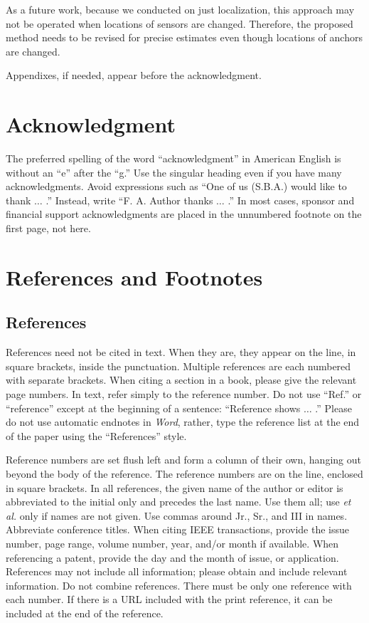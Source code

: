 \documentclass{ieeeaccess}
\begin{document}
As a future work, because we conducted on just localization, this approach may not be operated when locations of sensors are changed. Therefore, the proposed method needs to be revised for precise estimates even though locations of anchors are changed. 

\appendices

Appendixes, if needed, appear before the acknowledgment.

\section*{Acknowledgment}

The preferred spelling of the word ``acknowledgment'' in American English is 
without an ``e'' after the ``g.'' Use the singular heading even if you have 
many acknowledgments. Avoid expressions such as ``One of us (S.B.A.) would 
like to thank $\ldots$ .'' Instead, write ``F. A. Author thanks $\ldots$ .'' In most 
cases, sponsor and financial support acknowledgments are placed in the 
unnumbered footnote on the first page, not here.

\section*{References and Footnotes}

\subsection{References}
References need not be cited in text. When they are, they appear on the 
line, in square brackets, inside the punctuation. Multiple references are 
each numbered with separate brackets. When citing a section in a book, 
please give the relevant page numbers. In text, refer simply to the 
reference number. Do not use ``Ref.'' or ``reference'' except at the 
beginning of a sentence: ``Reference \cite{b3} shows $\ldots$ .'' Please do not use 
automatic endnotes in \emph{Word}, rather, type the reference list at the end of the 
paper using the ``References'' style.

Reference numbers are set flush left and form a column of their own, hanging 
out beyond the body of the reference. The reference numbers are on the line, 
enclosed in square brackets. In all references, the given name of the author 
or editor is abbreviated to the initial only and precedes the last name. Use 
them all; use \emph{et al.} only if names are not given. Use commas around Jr., 
Sr., and III in names. Abbreviate conference titles. When citing IEEE 
transactions, provide the issue number, page range, volume number, year, 
and/or month if available. When referencing a patent, provide the day and 
the month of issue, or application. References may not include all 
information; please obtain and include relevant information. Do not combine 
references. There must be only one reference with each number. If there is a 
URL included with the print reference, it can be included at the end of the 
reference. 
\end{document}
